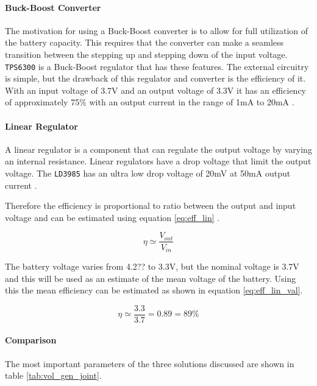 \paragraph{Buck-Boost Converter}
The motivation for using a Buck-Boost converter is to allow for full utilization of the battery capacity.
This requires that the converter can make a seamless transition between the stepping up and stepping down of the input voltage. 
\texttt{TPS6300} is a Buck-Boost regulator that has these features.
The external circuitry is simple, but the drawback of this regulator and converter is the efficiency of it.
With an input voltage of 3.7V and an output voltage of 3.3V it has an efficiency of approximately 75\% with an output current in the range of 1mA to 20mA \cite{TPS6300}.

\paragraph{Linear Regulator}
A linear regulator is a component that can regulate the output voltage by varying an internal resistance.
Linear regulators have a drop voltage that limit the output voltage. 
The \texttt{LD3985} has an ultra low drop voltage of 20mV at 50mA output current \cite{LD3985}.

Therefore the efficiency is proportional to ratio between the output and input voltage and can be estimated using equation \ref{eq:eff_lin} \cite{ap_note_140}.

\begin{equation}
	\eta \simeq \frac{V_{out}}{V_{in}}
	\label{eq:eff_lin}
\end{equation}

The battery voltage varies from 4.2?? to 3.3V, but the nominal voltage is 3.7V and this will be used as an estimate of the mean voltage of the battery.
Using this the mean efficiency can be estimated as shown in equation \ref{eq:eff_lin_val}.

\begin{equation}
	\eta \simeq \frac{3.3}{3.7} = 0.89 = 89\%
	\label{eq:eff_lin_val}
\end{equation}


\paragraph{Comparison}
The most important parameters of the three solutions discussed are shown in table \ref{tab:vol_gen_joint}.

